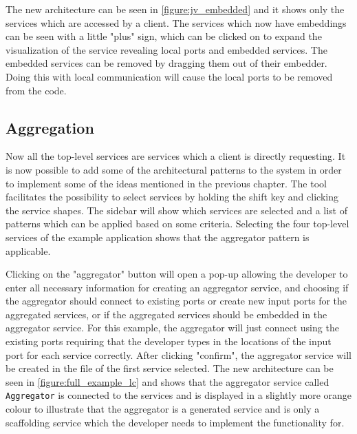 The new architecture can be seen in \cref{figure:jv_embedded} and it shows only the services which are accessed by a client. The services which now have embeddings can be seen with a little "plus" sign, which can be clicked on to expand the visualization of the service revealing local ports and embedded services.
The embedded services can be removed by dragging them out of their embedder. Doing this with local communication will cause the local ports to be removed from the code.

\subsection{Aggregation}
Now all the top-level services are services which a client is directly requesting. It is now possible to add some of the architectural patterns to the system in order to implement some of the ideas mentioned in the previous chapter.
The tool facilitates the possibility to select services by holding the shift key and clicking the service shapes. The sidebar will show which services are selected and a list of patterns which can be applied based on some
criteria. Selecting the four top-level services of the example application shows that the aggregator pattern is applicable.

Clicking on the "aggregator" button will open a pop-up allowing the developer to enter all necessary information for creating an aggregator service, and choosing if the aggregator should connect to existing ports or create new input ports for the aggregated services, or if the aggregated services should be embedded in the aggregator service.
For this example, the aggregator will just connect using the existing ports requiring that the developer types in the locations of the input port for each service correctly.
After clicking "confirm", the aggregator service will be created in the file of the first service selected. The new architecture can be seen in \cref{figure:full_example_lc} and shows that the aggregator service called \texttt{Aggregator} is connected to the services and is displayed in a slightly more orange colour 
to illustrate that the aggregator is a generated service and is only a scaffolding service which the developer needs to implement the functionality for.

